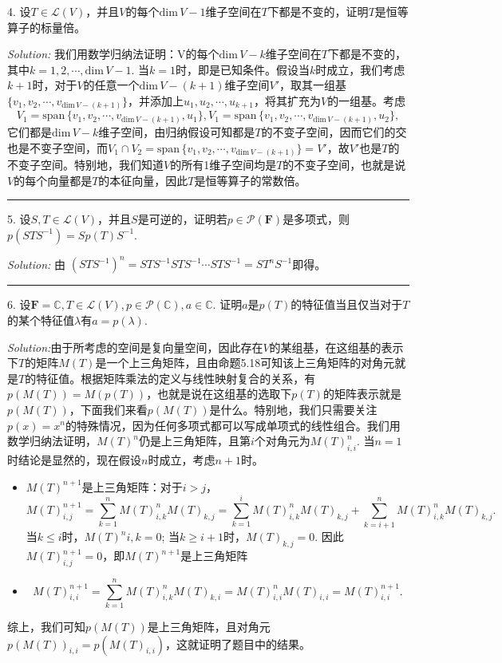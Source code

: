\documentclass[a4[paper]{article}
\def\dim{\mathrm{dim}\,}
\def\span{\mathrm{span}\,}
\def\sep{\bigskip
\noindent{}\rule{\textwidth}{0.1mm}
\bigskip}
\begin{document}
\noindent{}4. 设$T\in\mathcal{L}(V)$，并且$V$的每个$\dim V-1$维子空间在$T$下都是不变的，证明$T$是恒等算子的标量倍。

\smallskip

\noindent{}\emph{Solution:} 我们用数学归纳法证明：V的每个$\dim V-k$维子空间在$T$下都是不变的，其中$k=1,2,\cdots,\dim V-1$. 当$k=1$时，即是已知条件。假设当$k$时成立，我们考虑$k+1$时，对于$V$的任意一个$\dim V - (k+1)$维子空间$V'$，取其一组基$\{v_1,v_2,\cdots,v_{\dim V-(k+1)}\}$，并添加上$u_1,u_2,\cdots,u_{k+1}$，将其扩充为$V$的一组基。考虑
$$V_1 = \span\{v_1,v_2,\cdots,v_{\dim V-(k+1)},u_1\},V_1 = \span\{v_1,v_2,\cdots,v_{\dim V-(k+1)},u_2\},$$
它们都是$\dim V-k$维子空间，由归纳假设可知都是$T$的不变子空间，因而它们的交也是不变子空间，而$V_1\cap V_2 = \span \{v_1,v_2,\cdots,v_{\dim V-(k+1)}\}=V'$，故$V'$也是$T$的不变子空间。特别地，我们知道$V$的所有1维子空间均是$T$的不变子空间，也就是说$V$的每个向量都是$T$的本征向量，因此$T$是恒等算子的常数倍。

\sep

\noindent{}5. 设$S,T\in\mathcal{L}(V)$，并且$S$是可逆的，证明若$p\in\mathcal{P}(\mathbf{F})$是多项式，则$p(STS^{-1})=Sp(T)S^{-1}$.

\smallskip

\noindent{}\emph{Solution:} 由 $(STS^{-1})^n = STS^{-1} STS^{-1}\cdots STS^{-1} = ST^nS^{-1}$即得。

\sep

\noindent{}6. 设$\mathbf{F}=\mathbb{C},T\in\mathcal{L}(V),p\in\mathcal{P}(\mathbb{C}),a\in\mathbb{C}$. 证明$a$是$p(T)$的特征值当且仅当对于$T$的某个特征值$\lambda$有$a = p(\lambda)$.

\smallskip

\noindent{}\emph{Solution:}由于所考虑的空间是复向量空间，因此存在$V$的某组基，在这组基的表示下$T$的矩阵$M(T)$是一个上三角矩阵，且由命题5.18可知该上三角矩阵的对角元就是$T$的特征值。根据矩阵乘法的定义与线性映射复合的关系，有$p(M(T))=M(p(T))$，也就是说在这组基的选取下$p(T)$的矩阵表示就是$p(M(T))$，下面我们来看$p(M(T))$是什么。特别地，我们只需要关注$p(x)=x^n$的特殊情况，因为任何多项式都可以写成单项式的线性组合。我们用数学归纳法证明，$M(T)^n$仍是上三角矩阵，且第$i$个对角元为$M(T)_{i,i}^n$. 当$n=1$时结论是显然的，现在假设$n$时成立，考虑$n+1$时。

\begin{itemize}
\item $M(T)^{n+1}$是上三角矩阵：对于$i>j$， 
$$M(T)^{n+1}_{i,j} = \sum_{k=1}^n M(T)^n_{i,k}M(T)_{k,j} =\sum_{k=1}^i M(T)^n_{i,k}M(T)_{k,j} + \sum_{k=i+1}^n M(T)^n_{i,k}M(T)_{k,j}.$$
当$k\le i$时，$M(T)^n{i,k}=0$; 当$k\ge i+1$时，$M(T)_{k,j}=0$. 因此$M(T)^{n+1}_{i,j} =0$，即$M(T)^{n+1}$是上三角矩阵

\item 
\[M(T)^{n+1}_{i,i} = \sum_{k=1}^n  M(T)^n_{i,k}M(T)_{k,i}=  M(T)^n_{i,i}M(T)_{i,i} = M(T)_{i,i}^{n+1}.\]
\end{itemize}
综上，我们可知$p(M(T))$是上三角矩阵，且对角元$p(M(T))_{i,i}= p (M(T)_{i,i})$，这就证明了题目中的结果。
\end{document}
